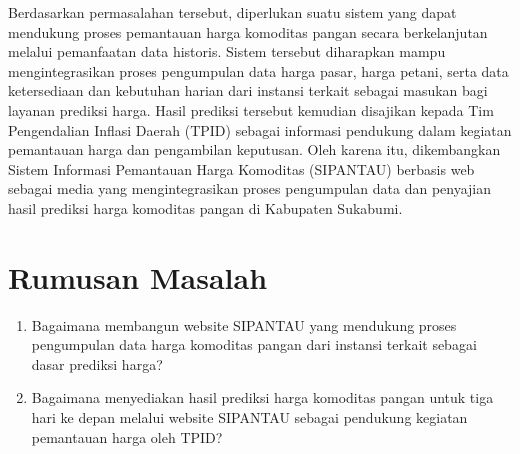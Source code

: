Berdasarkan permasalahan tersebut, diperlukan suatu sistem yang dapat mendukung proses pemantauan harga komoditas pangan secara berkelanjutan melalui pemanfaatan data historis. Sistem tersebut diharapkan mampu mengintegrasikan proses pengumpulan data harga pasar, harga petani, serta data ketersediaan dan kebutuhan harian dari instansi terkait sebagai masukan bagi layanan prediksi harga. Hasil prediksi tersebut kemudian disajikan kepada Tim Pengendalian Inflasi Daerah (TPID) sebagai informasi pendukung dalam kegiatan pemantauan harga dan pengambilan keputusan. Oleh karena itu, dikembangkan Sistem Informasi Pemantauan Harga Komoditas (SIPANTAU) berbasis web sebagai media yang mengintegrasikan proses pengumpulan data dan penyajian hasil prediksi harga komoditas pangan di Kabupaten Sukabumi.



\section{Rumusan Masalah}

\begin{enumerate}
\item Bagaimana membangun website SIPANTAU yang mendukung proses pengumpulan data harga komoditas pangan dari instansi terkait sebagai dasar prediksi harga?
\item Bagaimana menyediakan hasil prediksi harga komoditas pangan untuk tiga hari ke depan melalui website SIPANTAU sebagai pendukung kegiatan pemantauan harga oleh TPID?
\end{enumerate}


